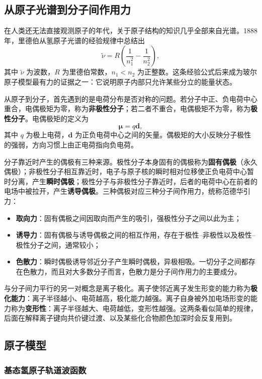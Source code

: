 \documentclass[UTF8]{ctexbook}
\begin{document}
\subsection{从原子光谱到分子间作用力}

在人类还无法直接观测原子的年代，关于原子结构的知识几乎全部来自光谱。1888 年，里德伯从氢原子光谱的经验规律中总结出
\[
\tilde{\nu}=R\left(\frac{1}{n_1^2}-\frac{1}{n_2^2}\right),
\]
其中 $\tilde{\nu}$ 为波数，$R$ 为里德伯常数，$n_1<n_2$ 为正整数。这条经验公式后来成为玻尔原子模型最有力的证据之一：它说明原子内部只允许某些分立的能量状态。

从原子到分子，首先遇到的是电荷分布是否对称的问题。若分子中正、负电荷中心重合，电偶极矩为零，称为\textbf{非极性分子}；若二者不重合，电偶极矩不为零，称为\textbf{极性分子}。电偶极矩的定义为
\[
\boldsymbol{\mu}=q\mathbf{d},
\]
其中 $q$ 为极上电荷，$\mathbf{d}$ 为正负电荷中心之间的矢量。偶极矩的大小反映分子极性的强弱，方向习惯上由正电荷指向负电荷。

分子靠近时产生的偶极有三种来源。极性分子本身固有的偶极称为\textbf{固有偶极}（永久偶极）；非极性分子相互靠近时，电子与原子核的瞬时相对位移使正负电荷中心暂时分离，产生\textbf{瞬时偶极}；极性分子与非极性分子靠近时，后者的电荷中心在前者的电场中被拉开，产生\textbf{诱导偶极}。三种偶极对应三种分子间作用力，统称范德华引力：

\begin{itemize}
  \item \textbf{取向力}：固有偶极之间因取向而产生的吸引，强极性分子之间以此为主；
  \item \textbf{诱导力}：固有偶极与诱导偶极之间的相互作用，存在于极性--非极性以及极性--极性分子之间，通常较小；
  \item \textbf{色散力}：瞬时偶极诱导邻近分子产生瞬时偶极，异极相吸。一切分子之间都存在色散力，而且对大多数分子而言，色散力是分子间作用力的主要成分。
\end{itemize}

与分子间力平行的另一对概念是离子极化。离子使邻近离子发生形变的能力称为\textbf{极化能力}：离子半径越小、电荷越高，极化能力越强。离子自身被外加电场形变的能力称为\textbf{变形性}：离子半径越大、电荷越低，变形性越强。这两条看似简单的规律，后面在解释离子键向共价键过渡、以及某些化合物颜色加深时会反复用到。

\subsection{原子模型}

\subsubsection{基态氢原子轨道波函数}
\end{document}
